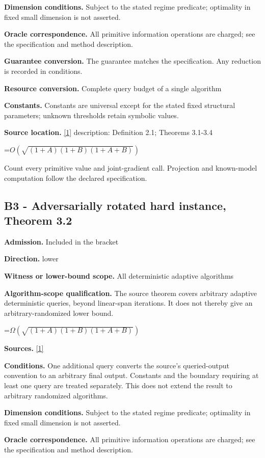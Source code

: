 \documentclass[10pt,a4paper]{article}
\newcommand{\AtlasMath}[1]{\par\begingroup\centering\setbox0=\hbox{$\displaystyle #1$}\ifdim\wd0>1.4\linewidth\typeout{ATLAS WIDE FORMULA: \the\wd0}\fi\ifdim\wd0>\linewidth\resizebox{\linewidth}{!}{\box0}\else\box0\fi\par\endgroup}
\begin{document}
\textbf{Dimension conditions.} Subject to the stated regime predicate; optimality in fixed small dimension is not asserted.

\textbf{Oracle correspondence.} All primitive information operations are charged; see the specification and method description.

\textbf{Guarantee conversion.} The guarantee matches the specification. Any reduction is recorded in conditions.

\textbf{Resource conversion.} Complete query budget of a single algorithm

\textbf{Constants.} Constants are universal except for the stated fixed structural parameters; unknown thresholds retain symbolic values.

\textbf{Source location.} \href{https://arxiv.org/pdf/2609.14235v2}{[1]} description: Definition 2.1; Theorems 3.1-3.4

\AtlasMath{O(\sqrt{(1+A)(1+B)(1+A+B)})}
Count every primitive value and joint-gradient call. Projection and known-model computation follow the declared specification.

\subsection{B3 - Adversarially rotated hard instance, Theorem 3.2}
\textbf{Admission.} Included in the bracket

\textbf{Direction.} lower

\textbf{Witness or lower-bound scope.} All deterministic adaptive algorithms

\textbf{Algorithm-scope qualification.} The source theorem covers arbitrary adaptive deterministic queries, beyond linear-span iterations. It does not thereby give an arbitrary-randomized lower bound.

\AtlasMath{\Omega(\sqrt{(1+A)(1+B)(1+A+B)})}
\textbf{Sources.} \href{https://arxiv.org/pdf/2609.14235v2}{[1]}

\textbf{Conditions.} One additional query converts the source’s queried-output convention to an arbitrary final output. Constants and the boundary requiring at least one query are treated separately. This does not extend the result to arbitrary randomized algorithms.

\textbf{Dimension conditions.} Subject to the stated regime predicate; optimality in fixed small dimension is not asserted.

\textbf{Oracle correspondence.} All primitive information operations are charged; see the specification and method description.
\end{document}
